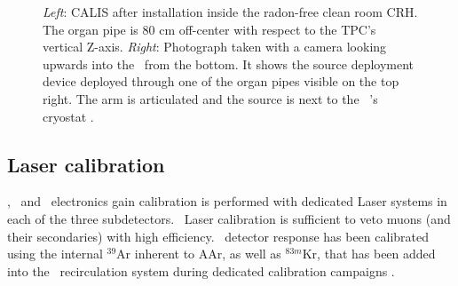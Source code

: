 \begin{figure}[htbp]
 \centering
{}
\caption{\textit{Left}: CALIS after installation inside the radon-free clean room CRH. The organ pipe is 80 cm off-center with respect to the TPC's vertical Z-axis. \textit{Right}: Photograph taken with a camera looking upwards into the \lsv\ from the bottom. It shows the source deployment device deployed through one of the organ pipes visible on the top right. The arm is articulated and the source is next to the \lar\ \tpc's cryostat \cite{Agnes:2015qyz}.
\label{fig:CALIS_photos}}
\end{figure}

\subsection*{Laser calibration}
\wcv, \lsv\ and \tpc\ electronics gain calibration is performed with dedicated Laser systems in each of the three subdetectors. \wcv\ Laser calibration is sufficient to veto muons (and their secondaries) with high efficiency. \tpc\ detector response has been calibrated using the internal $^{39}$Ar inherent to AAr, as well as $^{83m}$Kr, that has been added into the \lar\ recirculation system during dedicated calibration campaigns \cite{Agnes:2015gu}.







